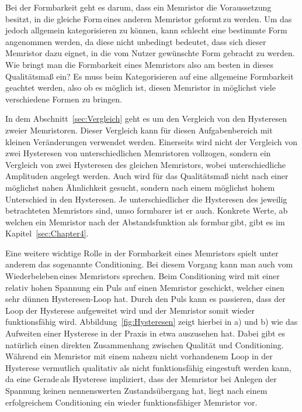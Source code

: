   Bei der Formbarkeit geht es darum, dass ein Memristor die Voraussetzung besitzt, in die gleiche \glqq Form\grqq\,eines anderen Memristor \glqq geformt\grqq\,zu werden. Um das jedoch allgemein kategorisieren zu können, kann schlecht eine bestimmte Form angenommen werden, da diese nicht unbedingt bedeutet, dass sich dieser Memristor dazu eignet, in die vom Nutzer gewünschte Form gebracht zu werden. Wie bringt man die Formbarkeit eines Memristors also am besten in dieses Qualitätsmaß ein? Es muss beim Kategorisieren auf eine allgemeine Formbarkeit geachtet werden, also ob es möglich ist, diesen Memristor in möglichst viele verschiedene Formen zu bringen.

  In dem Abschnitt~\ref{sec:Vergleich} geht es um den Vergleich von den Hysteresen zweier Memristoren. Dieser Vergleich kann für diesen Aufgabenbereich mit kleinen Veränderungen verwendet werden. Einerseits wird nicht der Vergleich von zwei Hysteresen von unterschiedlichen Memristoren vollzogen, sondern ein Vergleich von zwei Hysteresen des gleichen Memristors, wobei unterschiedliche Amplituden angelegt werden. Auch wird für das Qualitätsmaß nicht nach einer möglichst nahen Ähnlichkeit gesucht, sondern nach einem möglichst hohem Unterschied in den Hysteresen. Je unterschiedlicher die Hysteresen des jeweilig betrachteten Memristors sind, umso formbarer ist er auch. Konkrete Werte, ab welchen ein Memristor nach der Abstandsfunktion als \glqq formbar\grqq\,gibt, gibt es im Kapitel~\ref{sec:Chapter4}.


  Eine weitere wichtige Rolle in der Formbarkeit eines Memristors spielt unter anderem das sogenannte \glqq Conditioning\grqq. Bei diesem Vorgang kann man auch vom \glqq Wiederbeleben\grqq\,eines Memristors sprechen. Beim Conditioning wird mit einer relativ hohen Spannung ein Puls auf einen Memristor geschickt, welcher einen sehr dünnen Hysteresen-Loop hat. Durch den Puls kann es passieren, dass der Loop der Hysterese aufgeweitet wird und der Memristor somit wieder funktionsfähig wird. Abbildung~\ref{fig:Hysteresen} zeigt hierbei in a) und b) wie das Aufweiten einer Hysterese in der Praxis in etwa auszusehen hat. Dabei gibt es natürlich einen direkten Zusammenhang zwischen Qualität und Conditioning. Während ein Memristor mit einem nahezu nicht vorhandenem Loop in der Hysterese vermutlich qualitativ als nicht funktionsfähig eingestuft werden kann, da eine \glqq Gerade\grqq\,als Hysterese impliziert, dass der Memristor bei Anlegen der Spannung keinen nennenswerten Zustandsübergang hat, liegt nach einem erfolgreichem Conditioning ein wieder funktionsfähiger Memristor vor.

